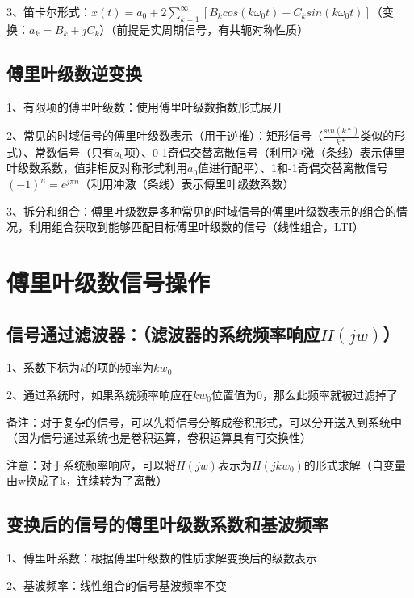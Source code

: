 3、笛卡尔形式：$x(t)=a_0 + 2\sum_{k=1}^{\infty}[B_k cos(k\omega_0t)-C_k sin(k\omega_0t)]$（变换：$a_k=B_k+jC_k$）（前提是实周期信号，有共轭对称性质）



\subsection{傅里叶级数逆变换}

1、有限项的傅里叶级数：使用傅里叶级数指数形式展开

2、常见的时域信号的傅里叶级数表示（用于逆推）：矩形信号（$\frac{sin(k*)}{k*}$类似的形式）、常数信号（只有$a_0$项）、0-1奇偶交替离散信号（利用冲激（条线）表示傅里叶级数系数，值非相反对称形式利用$a_0$值进行配平）、1和-1奇偶交替离散信号$(-1)^n = e^{j\pi n}$（利用冲激（条线）表示傅里叶级数系数）

3、拆分和组合：傅里叶级数是多种常见的时域信号的傅里叶级数表示的组合的情况，利用组合获取到能够匹配目标傅里叶级数的信号（线性组合，LTI）

\section{傅里叶级数信号操作}



\subsection{信号通过滤波器：（滤波器的系统频率响应$H(jw)$）}

1、系数下标为$k$的项的频率为$kw_0$

2、通过系统时，如果系统频率响应在$kw_0$位置值为0，那么此频率就被过滤掉了

备注：对于复杂的信号，可以先将信号分解成卷积形式，可以分开送入到系统中（因为信号通过系统也是卷积运算，卷积运算具有可交换性）

注意：对于系统频率响应，可以将$H(jw)$表示为$H(jkw_0)$的形式求解（自变量由w换成了k，连续转为了离散）



\subsection{变换后的信号的傅里叶级数系数和基波频率}

1、傅里叶系数：根据傅里叶级数的性质求解变换后的级数表示

2、基波频率：线性组合的信号基波频率不变



